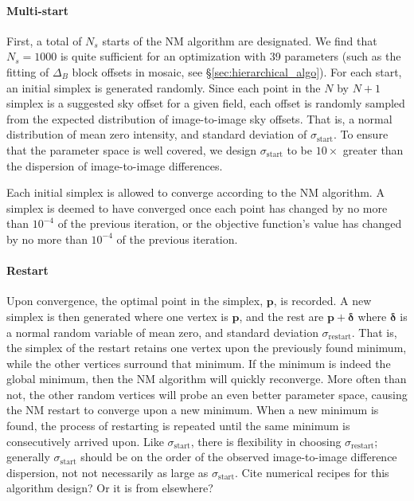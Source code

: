 \documentclass[iop]{emulateapj}
\newcommand{\vect}[1]{\boldsymbol{#1}} %
\newcommand{\todo}[1]{\textcolor{BurntOrange}{\textsf{#1}}} %
\newcommand{\Sec}[1]{\S\ref{sec:#1}}  %
\begin{document}
\paragraph{Multi-start} First, a total of $N_s$ starts of the NM algorithm are designated.
We find that $N_s=1000$ is quite sufficient for an optimization with 39 parameters (such as the fitting of $\Delta_B$ block offsets in mosaic, see \Sec{hierarchical_algo}).
For each start, an initial simplex is generated randomly.
Since each point in the $N$ by $N+1$ simplex is a suggested sky offset for a given field, each offset is randomly sampled from the expected distribution of image-to-image sky offsets.
That is, a normal distribution of mean zero intensity, and standard deviation of $\sigma_\mathrm{start}$.
To ensure that the parameter space is well covered, we design $\sigma_\mathrm{start}$ to be $10\times$ greater than the dispersion of image-to-image differences.

Each initial simplex is allowed to converge according to the NM algorithm.
A simplex is deemed to have converged once each point has changed by no more than \todo{$10^{-4}$} of the previous iteration, or the objective function's value has changed by no more than \todo{$10^{-4}$} of the previous iteration. 

\paragraph{Restart} Upon convergence, the optimal point in the simplex, $\vect{p}$, is recorded.
A new simplex is then generated where one vertex is $\vect{p}$, and the rest are $\vect{p}+\vect{\delta}$ where $\vect{\delta}$ is a normal random variable of mean zero, and standard deviation $\sigma_\mathrm{restart}$.
That is, the simplex of the restart retains one vertex upon the previously found minimum, while the other vertices surround that minimum.
If the minimum is indeed the global minimum, then the NM algorithm will quickly reconverge.
More often than not, the other random vertices will probe an even better parameter space, causing the NM restart to converge upon a new minimum.
When a new minimum is found, the process of restarting is repeated until the same minimum is consecutively arrived upon.
Like $\sigma_\mathrm{start}$, there is flexibility in choosing $\sigma_\mathrm{restart}$; generally $\sigma_\mathrm{start}$ should be on the order of the observed image-to-image difference dispersion, not not necessarily as large as $\sigma_\mathrm{start}$.
\todo{Cite numerical recipes for this algorithm design? Or it is from elsewhere?}
\end{document}

